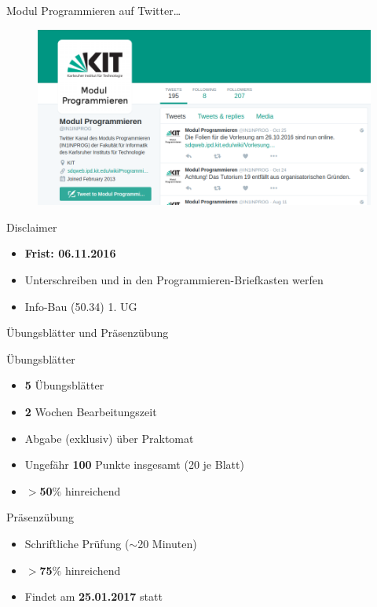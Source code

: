\documentclass[18pt]{beamer}
\begin{document}
\begin{frame}{Modul Programmieren auf Twitter\ldots}
    \begin{figure}
        \includegraphics[scale=.4]{img/modulprogtwitter.png}
    \end{figure}
\end{frame}

\begin{frame}{Disclaimer}
    \begin{itemize}
        \item \textbf{Frist: \alert{06.11.2016}}
        \item Unterschreiben und in den Programmieren-Briefkasten werfen
        \item Info-Bau (50.34) 1. UG
    \end{itemize}
\end{frame}

\begin{frame}{Übungsblätter und Präsenzübung}
    \begin{block}{Übungsblätter}
        \begin{itemize}
            \item \textbf{5} Übungsblätter
            \item \textbf{2} Wochen Bearbeitungszeit
            \item Abgabe (exklusiv) über Praktomat
            \item Ungefähr \textbf{100} Punkte insgesamt (20 je Blatt)
            \item $>$\textbf{50}$\%$ hinreichend
        \end{itemize}
    \end{block}

    \pause

    \begin{block}{Präsenzübung}
        \begin{itemize}
            \item Schriftliche Prüfung ($\sim$20 Minuten)
            \item $>$\textbf{75}$\%$ hinreichend
            \item Findet am \textbf{25.01.2017} statt
        \end{itemize}
    \end{block}


\end{frame}
\end{document}

